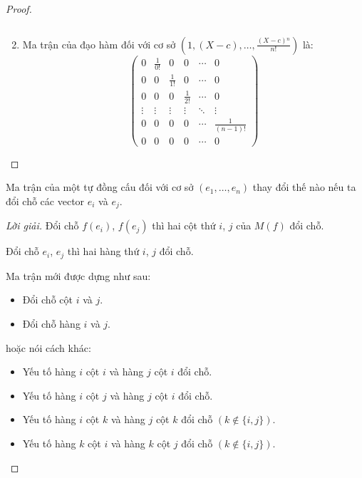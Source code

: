 \documentclass[class=nhvh-linear-algebra,crop=false]{standalone}
\begin{document}
\begin{proof}
\begin{enumerate}[label = (\alph*)]
\[              \]
        \item Ma trận của đạo hàm đối với cơ sở $(1, (X-c), \ldots, \frac{(X-c){}^{n}}{n!})$ là:
              \[
                  \begin{pmatrix}
                      0      & \frac{1}{0!} & 0            & 0            & \cdots & 0                \\
                      0      & 0            & \frac{1}{1!} & 0            & \cdots & 0                \\
                      0      & 0            & 0            & \frac{1}{2!} & \cdots & 0                \\
                      \vdots & \vdots       & \vdots       & \vdots       & \ddots & \vdots           \\
                      0      & 0            & 0            & 0            & \cdots & \frac{1}{(n-1)!} \\
                      0      & 0            & 0            & 0            & \cdots & 0
                  \end{pmatrix}
              \]
    \end{enumerate}
\end{proof}

\begin{exercise}
    Ma trận của một tự đồng cấu đối với cơ sở $(e_{1},\ldots,e_{n})$ thay đổi thế nào nếu ta đổi chỗ các vector $e_{i}$ và $e_{j}$.
\end{exercise}

\begin{proof}[Lời giải]
    Đổi chỗ $f(e_{i})$, $f(e_{j})$ thì hai cột thứ $i$, $j$ của $M(f)$ đổi chỗ.
    \par Đổi chỗ $e_{i}$, $e_{j}$ thì hai hàng thứ $i$, $j$ đổi chỗ.
    \par Ma trận mới được dựng như sau:
    \begin{itemize}
        \item Đổi chỗ cột $i$ và $j$.
        \item Đổi chỗ hàng $i$ và $j$.
    \end{itemize}
    \par hoặc nói cách khác:
    \begin{itemize}
        \item Yếu tố hàng $i$ cột $i$ và hàng $j$ cột $i$ đổi chỗ.
        \item Yếu tố hàng $i$ cột $j$ và hàng $j$ cột $i$ đổi chỗ.
        \item Yếu tố hàng $i$ cột $k$ và hàng $j$ cột $k$ đổi chỗ $(k\not\in\{ i, j \})$.
        \item Yếu tố hàng $k$ cột $i$ và hàng $k$ cột $j$ đổi chỗ $(k\not\in\{ i, j \})$.
    \end{itemize}
\end{proof}
\end{document}
